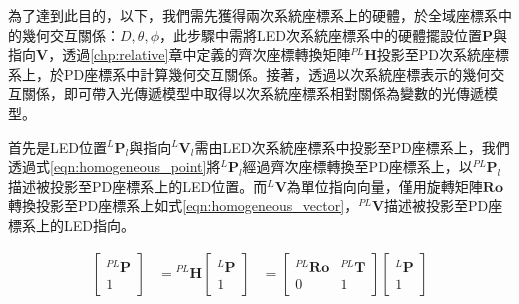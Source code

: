         為了達到此目的，以下，我們需先獲得兩次系統座標系上的硬體，於全域座標系中的幾何交互關係：$D,\theta,\phi$，此步驟中需將LED次系統座標系中的硬體擺設位置$\boldsymbol{P}$與指向$\boldsymbol{V}$，透過\ref{chp:relative}章中定義的齊次座標轉換矩陣$^{PL}\boldsymbol{H}$投影至PD次系統座標系上，於PD座標系中計算幾何交互關係。接著，透過以次系統座標表示的幾何交互關係，即可帶入光傳遞模型中取得以次系統座標系相對關係為變數的光傳遞模型。
        
        
 
        
    
            


            
                首先是LED位置$^L \boldsymbol{P}_l$與指向$^L \boldsymbol{V}_l$需由LED次系統座標系中投影至PD座標系上，我們透過式\ref{eqn:homogeneous_point}將$^L \boldsymbol{P}_l$經過齊次座標轉換至PD座標系上，以$^{PL} \boldsymbol{P}_l$描述被投影至PD座標系上的LED位置。而$^L \boldsymbol{V}$為單位指向向量，僅用旋轉矩陣$\boldsymbol{Ro}$轉換投影至PD座標系上如式\ref{eqn:homogeneous_vector}，$^{PL}\boldsymbol{V}$描述被投影至PD座標系上的LED指向。
        
                \begin{equation}
                    \label{eqn:homogeneous_point}
                    \begin{aligned}
                    \left[\begin{array}{cc}
                    { }^{P L} \boldsymbol{P} \\
                    1
                    \end{array}\right]&={ }^{P L} \boldsymbol{H}\left[\begin{array}{c}
                    { }^{L} \boldsymbol{P} \\
                    1
                    \end{array}\right] &=\left[\begin{array}{cc}
                    { }^{P L} \boldsymbol{R} \boldsymbol{o} & { }^{P L} \boldsymbol{T} \\
                    0 & 1
                    \end{array}\right]\left[\begin{array}{c}
                    { }^{L} \boldsymbol{P} \\
                    1
                    \end{array}\right] \\
                \end{aligned}
                \end{equation}
                

